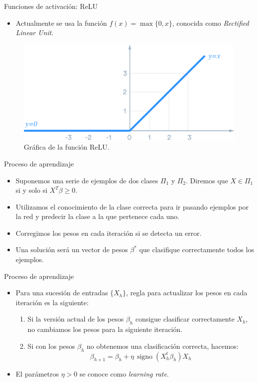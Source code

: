\documentclass[spanish]{beamer}
\begin{document}
\begin{frame}{Funciones de activación: ReLU}
  \begin{itemize}
    \item Actualmente se usa la función $f(x) = \max \{0, x\}$, conocida como \textit{Rectified Linear Unit}.
  \end{itemize}

    \begin{figure}[h]
    \centering
    \includegraphics[width=.75\textwidth]{img/relu}
    \caption{Gráfica de la función ReLU.}
  \end{figure}

\end{frame}

\begin{frame}{Proceso de aprendizaje}
\begin{itemize}
\item Suponemos una serie de ejemplos de dos clases $\Pi_1$ y $\Pi_2$. Diremos que $X \in \Pi_1$ si y solo si $X^T\beta \ge 0$.
\item Utilizamos el conocimiento de la clase correcta para ir pasando ejemplos por la red y predecir la clase a la que pertenece cada uno.
\item Corregimos los pesos en cada iteración si se detecta un error.
\item Una solución será un vector de pesos $\beta^\ast$ que clasifique correctamente todos los ejemplos.
\end{itemize}
\end{frame}

\begin{frame}{Proceso de aprendizaje}
\begin{itemize}
\item Para una sucesión de entradas $\{X_h\}$, regla para actualizar los pesos en cada iteración es la siguiente:
  \begin{enumerate}
    \item Si la versión actual de los pesos $\beta_h$ consigue clasificar correctamente $X_h$, no cambiamos los pesos para la siguiente iteración.
    \item Si con los pesos $\beta_h$ no obtenemos una clasificación correcta, hacemos:
    $$\beta_{h+1} = \beta_h + \eta \, \operatorname{signo}(X^{t}_{h} \beta_h)X_h $$
  \end{enumerate}
  \item El parámetros $\eta > 0$ se conoce como \textit{learning rate}.
\end{itemize}
\end{frame}
\end{document}
